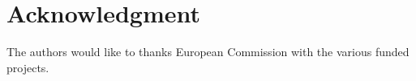 \documentclass[journal]{IEEEtran}
\begin{document}

\section*{Acknowledgment}
The authors would like to thanks European Commission with the various funded projects.



%
%
%
\end{document}
